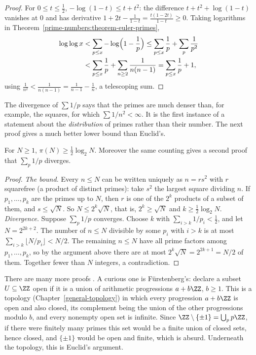 \begin{proof}
For $0 \leq t \leq \frac12$, $-\log(1 - t) \leq t + t^2$: the difference $t + t^2 + \log(1 - t)$ vanishes at $0$ and has derivative $1 + 2t - \frac{1}{1 - t} = \frac{t(1 - 2t)}{1 - t} \geq 0$. Taking
logarithms in Theorem~\ref{prime-numbers:theorem-euler-primes},
\[
\begin{aligned}
\log\log x &< \sum_{p \leq x}-\log\Bigl(1 - \frac1p\Bigr) \leq \sum_{p \leq x}\frac1p + \sum_{p}\frac{1}{p^2}\\
&< \sum_{p \leq x}\frac1p + \sum_{n \geq 2}\frac{1}{n(n - 1)} = \sum_{p \leq x}\frac1p + 1,
\end{aligned}
\]
using $\frac{1}{n^2} < \frac{1}{n(n - 1)} = \frac{1}{n - 1} - \frac1n$, a telescoping sum.
\end{proof}

The divergence of $\sum 1/p$ says that the primes are much denser than, for example, the squares, for which $\sum 1/n^2 < \infty$. It is the first instance of a statement about the
\emph{distribution} of primes rather than their number. The next proof gives a much better lower bound than Euclid's.

\begin{theorem}[Erd\H{o}s]\label{prime-numbers:theorem-erdos-lower-bound}
For $N \geq 1$, $\pi(N) \geq \frac{1}{2}\log_2 N$. Moreover the same counting gives a second proof that $\sum_p1/p$ diverges.
\end{theorem}

\begin{proof}
\emph{The bound.} Every $n \leq N$ can be written uniquely as $n = rs^2$ with $r$ squarefree (a product of distinct primes): take $s^2$ the largest square dividing $n$. If $p_1, \ldots, p_k$ are the
primes up to $N$, then $r$ is one of the $2^k$ products of a subset of them, and $s \leq \sqrt{N}$. So $N \leq 2^k\sqrt{N}$, that is, $2^k \geq \sqrt{N}$ and $k \geq \frac12\log_2N$.
\emph{Divergence.} Suppose $\sum_p1/p$ converges. Choose $k$ with $\sum_{i > k}1/p_i < \frac12$, and let $N = 2^{2k+2}$. The number of $n \leq N$ divisible by some $p_i$ with $i > k$ is at most
$\sum_{i > k}\lfloor N/p_i\rfloor < N/2$. The remaining $n \leq N$ have all prime factors among $p_1, \ldots, p_k$, so by the argument above there are at most $2^k\sqrt{N} = 2^{2k+1} = N/2$ of
them. Together fewer than $N$ integers, a contradiction.
\end{proof}

\begin{remark}\label{prime-numbers:remark-furstenberg}
There are many more proofs \cite[Chapter~1]{aigner-ziegler}. A curious one is Fürstenberg's: declare a subset $U \subseteq \ZZ$ open if it is a union of arithmetic progressions
$a + b\ZZ$, $b \geq 1$. This is a topology (Chapter~\ref{general-topology}) in which every progression $a + b\ZZ$ is open and also closed, its complement being the union of the other
progressions modulo $b$, and every nonempty open set is infinite. Since $\ZZ \setminus \{\pm 1\} = \bigcup_p p\ZZ$, if there were finitely many primes this set would be a finite union of closed sets,
hence closed, and $\{\pm 1\}$ would be open and finite, which is absurd. Underneath the topology, this is Euclid's argument.
\end{remark}

